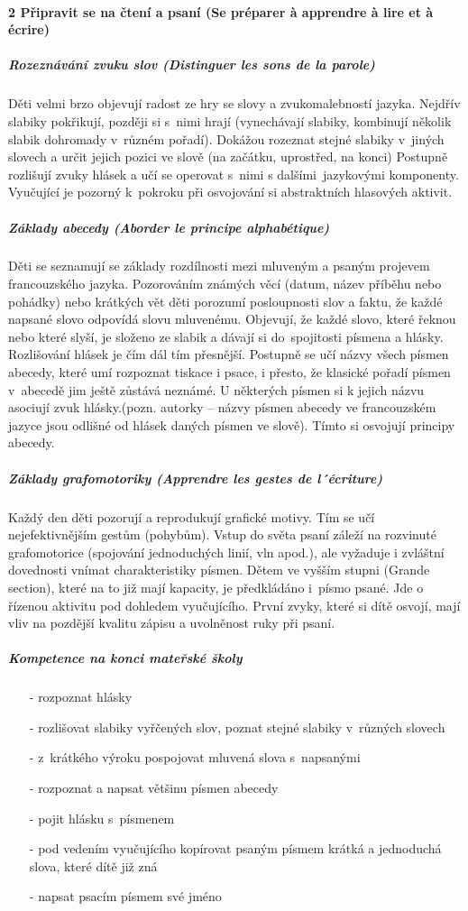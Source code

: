 			\paragraph*{2 Připravit se na čtení a psaní (Se préparer à apprendre à lire et à écrire)}
				\subparagraph{Rozeznávání zvuku slov (Distinguer les sons de la parole)}
					Děti velmi brzo objevují radost ze hry se slovy a zvukomalebností jazyka. Nejdřív slabiky pokřikují, později si s nimi hrají (vynechávají slabiky, kombinují několik slabik dohromady v různém pořadí). Dokážou rozeznat stejné slabiky v jiných slovech a určit jejich pozici ve slově (na začátku, uprostřed, na konci)
					Postupně rozlišují zvuky hlásek a učí se operovat s nimi s dalšími jazykovými komponenty. Vyučující je pozorný k pokroku při osvojování si abstraktních hlasových aktivit.
				\subparagraph{Základy abecedy (Aborder le principe alphabétique)}
					Děti se seznamují se základy rozdílnosti mezi mluveným a psaným projevem francouzského jazyka. Pozorováním známých věcí (datum, název příběhu nebo pohádky) nebo krátkých vět děti porozumí posloupnosti slov a faktu, že každé napsané slovo odpovídá slovu mluvenému. 
					Objevují, že každé slovo, které řeknou nebo které slyší, je složeno ze slabik a dávají si do spojitosti písmena a hlásky. Rozlišování hlásek je čím dál tím přesnější. Postupně se učí názvy všech písmen abecedy, které umí rozpoznat tiskace i psace, i přesto, že klasické pořadí písmen v abecedě jim ještě zůstává neznámé. U některých písmen si k jejich názvu asociují zvuk hlásky.(pozn. autorky – názvy písmen abecedy ve francouzském jazyce jsou odlišné od hlásek daných písmen ve slově). Tímto si osvojují principy abecedy.
				\subparagraph{Základy grafomotoriky (Apprendre les gestes de l´écriture)} 
					Každý den děti pozorují a reprodukují grafické motivy. Tím se učí nejefektivnějším gestům (pohybům). Vstup do světa psaní záleží na rozvinuté grafomotorice (spojování jednoduchých linií, vln apod.), ale vyžaduje i zvláštní dovednosti vnímat charakteristiky písmen. 
					Dětem ve vyšším stupni (Grande section), které na to již mají kapacity, je předkládáno i písmo psané. Jde o řízenou aktivitu pod dohledem vyučujícího. První zvyky, které si dítě osvojí, mají vliv na pozdější kvalitu zápisu a uvolněnost ruky při psaní. 
					
					\subparagraph{Kompetence na konci mateřské školy}
					\begin{itemize}
						\setlength\itemsep{-2mm}
						\item[-] rozpoznat hlásky
						\item[-] rozlišovat slabiky vyřčených slov, poznat stejné slabiky v různých slovech
						\item[-] z krátkého výroku pospojovat mluvená slova s napsanými
						\item[-] rozpoznat a napsat většinu písmen abecedy
						\item[-] pojit hlásku s písmenem
						\item[-] pod vedením vyučujícího kopírovat psaným písmem krátká a jednoduchá slova, které dítě již zná
						\item[-] napsat psacím písmem své jméno
					\end{itemize}


